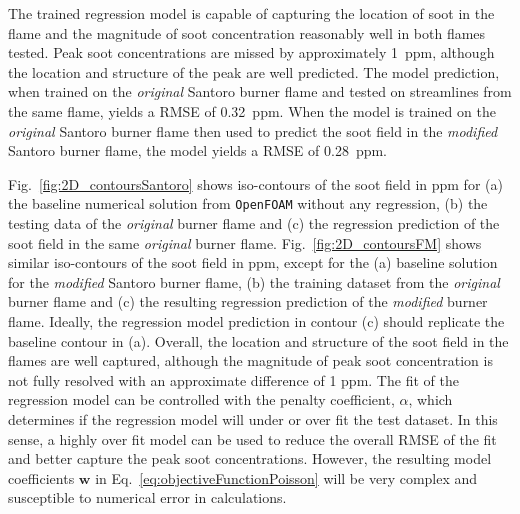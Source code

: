 \documentclass[12pt]{CHT-20}
\begin{document}
The trained regression model is capable of capturing the location of soot in the flame and the magnitude of soot concentration reasonably well in both flames tested. Peak soot concentrations are missed by approximately 1~ppm, although the location and structure of the peak are well predicted. The model prediction, when trained on the \emph{original} Santoro burner flame and tested on streamlines from the same flame, yields a RMSE of 0.32~ppm. When the model is trained on the \emph{original} Santoro burner flame then used to predict the soot field in the \emph{modified} Santoro burner flame, the model yields a RMSE of 0.28~ppm.

Fig.~\ref{fig:2D_contoursSantoro} shows iso-contours of the soot field in ppm for (a) the baseline numerical solution from \texttt{OpenFOAM} without any regression, (b) the testing data of the \emph{original} burner flame and (c) the regression prediction of the soot field in the same \emph{original} burner flame. Fig.~\ref{fig:2D_contoursFM} shows similar iso-contours of the soot field in ppm, except for the (a) baseline solution for the \emph{modified} Santoro burner flame, (b) the training dataset from the \emph{original} burner flame and (c) the resulting regression prediction of the \emph{modified} burner flame. Ideally, the regression model prediction in contour (c) should replicate the baseline contour in (a). Overall, the location and structure of the soot field in the flames are well captured, although the magnitude of peak soot concentration is not fully resolved with an approximate difference of 1 ppm. The fit of the regression model can be controlled with the penalty coefficient, $\alpha$, which determines if the regression model will under or over fit the test dataset. In this sense, a highly over fit model can be used to reduce the overall RMSE of the fit and better capture the peak soot concentrations. However, the resulting model coefficients $\mathbf{w}$ in Eq.~\ref{eq:objectiveFunctionPoisson} will be very complex and susceptible to numerical error in calculations.
\end{document}
